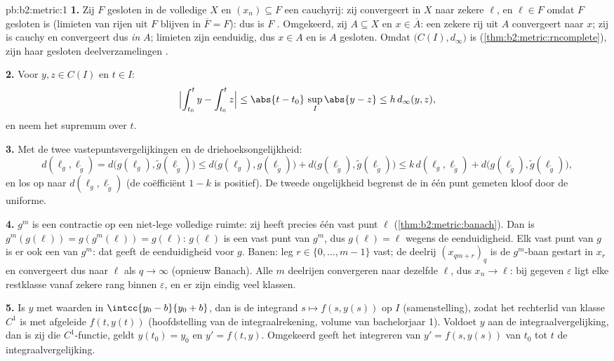 \begin{solution}{pb:b2:metric:1}
\textbf{1.} Zij $F$ gesloten in de volledige $X$ en $(x_n)
\subseteq F$ een cauchyrij: zij convergeert in $X$ naar zekere
$\ell$, en $\ell \in F$ omdat $F$ gesloten is (limieten van rijen
uit $F$ blijven in $\overline F = F$): dus is $F$ .
Omgekeerd, zij $A \subseteq X$  en $x \in \overline A$: een
zekere rij uit $A$ convergeert naar $x$; zij is cauchy en
convergeert dus \emph{in} $A$; limieten zijn eenduidig, dus $x \in
A$ en is $A$ gesloten. Omdat $\bigl(C(I), d_\infty\bigr)$ 
is (\cref{thm:b2:metric:rncomplete}), zijn haar gesloten
deelverzamelingen .

\textbf{2.} Voor $y, z \in C(I)$ en $t \in I$:
\[
\Bigl|\int_{t_0}^{t}y - \int_{t_0}^{t}z\Bigr| \leq
\abs{t - t_0}\,\sup_I\abs{y - z} \leq h\,d_\infty(y, z),
\]
en neem het supremum over $t$.

\textbf{3.} Met de twee vastepuntsvergelijkingen en de
driehoeksongelijkheid:
\[
d(\ell_g, \ell_{\widetilde g})
= d\bigl(g(\ell_g), \widetilde g(\ell_{\widetilde g})\bigr)
\leq d\bigl(g(\ell_g), g(\ell_{\widetilde g})\bigr) +
d\bigl(g(\ell_{\widetilde g}), \widetilde g(\ell_{\widetilde
g})\bigr)
\leq k\,d(\ell_g, \ell_{\widetilde g}) +
d\bigl(g(\ell_{\widetilde g}), \widetilde g(\ell_{\widetilde
g})\bigr),
\]
en los op naar $d(\ell_g, \ell_{\widetilde g})$ (de coëfficiënt $1
- k$ is positief). De tweede ongelijkheid begrenst de in één punt
gemeten kloof door de uniforme.

\textbf{4.} $g^m$ is een contractie op een niet-lege volledige
ruimte: zij heeft precies één vast punt $\ell$
(\cref{thm:b2:metric:banach}). Dan is $g^m(g(\ell)) =
g(g^m(\ell)) = g(\ell)$: $g(\ell)$ is een vast punt van $g^m$, dus
$g(\ell) = \ell$ wegens de eenduidigheid. Elk vast punt van $g$ is
er ook een van $g^m$: dat geeft de eenduidigheid voor $g$. Banen:
leg $r \in \{0, \dots, m-1\}$ vast; de deelrij $(x_{qm + r})_q$ is
de $g^m$-baan gestart in $x_r$ en convergeert dus naar $\ell$ als
$q \to \infty$ (opnieuw Banach). Alle $m$ deelrijen convergeren
naar dezelfde $\ell$, dus $x_n \to \ell$: bij gegeven $\varepsilon$
ligt elke restklasse vanaf zekere rang binnen $\varepsilon$, en er
zijn eindig veel klassen.

\textbf{5.} Is $y$  met waarden in $\intcc{y_0 - b}{y_0 +
b}$, dan is de integrand $s \mapsto f(s, y(s))$  op $I$
(samenstelling), zodat het rechterlid van klasse $C^1$ is met
afgeleide $f(t, y(t))$ (hoofdstelling van de integraalrekening,
volume van bachelorjaar 1). Voldoet $y$ aan de
integraalvergelijking, dan is zij die $C^1$-functie, geldt $y(t_0)
= y_0$ en $y' = f(t, y)$. Omgekeerd geeft het integreren van $y' =
f(s, y(s))$ van $t_0$ tot $t$ de integraalvergelijking.


\end{solution}
